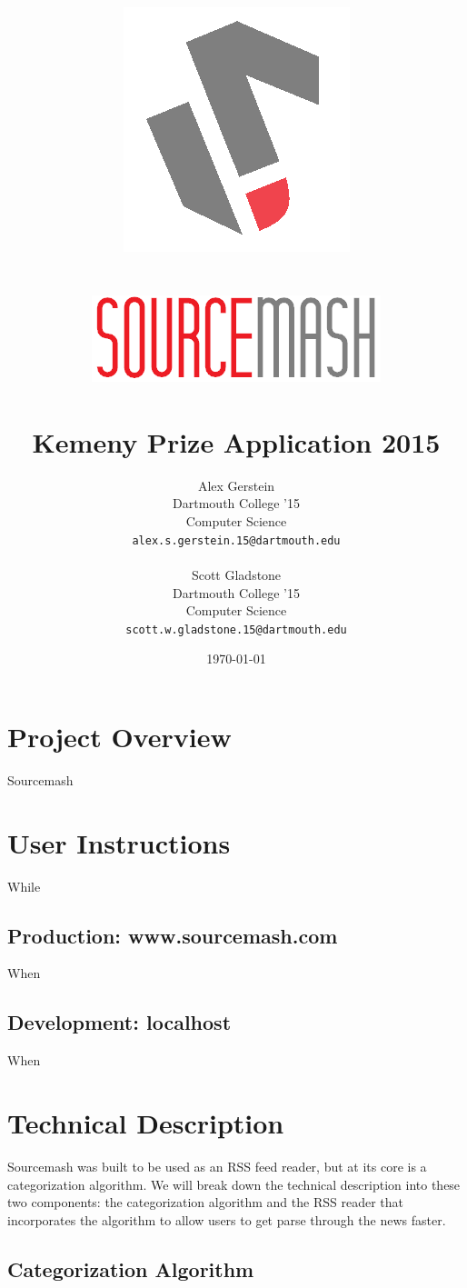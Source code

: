 \documentclass[11pt]{article}
\title{\includegraphics[scale=0.65]{solologo} \\~\\ \includegraphics[scale=0.75]{logotext} \\~\\ Kemeny Prize Application 2015}
\author{
	Alex Gerstein \\ Dartmouth College '15 \\ Computer Science \\ \texttt{alex.s.gerstein.15@dartmouth.edu}
	\\ \\
	Scott Gladstone \\ Dartmouth College '15 \\ Computer Science \\ \texttt{scott.w.gladstone.15@dartmouth.edu}
	}
\date{\today}
\begin{document}
\maketitle


\pagebreak
\section{Project Overview}

Sourcemash


\section{User Instructions}

While

\subsection{Production: www.sourcemash.com}

When

\subsection{Development: localhost}

When


\section{Technical Description}

Sourcemash was built to be used as an RSS feed reader, but at its core is a categorization algorithm. We will break down the technical description into these two components: the categorization algorithm and the RSS reader that incorporates the algorithm to allow users to get parse through the news faster.

\subsection{Categorization Algorithm}
\end{document}
